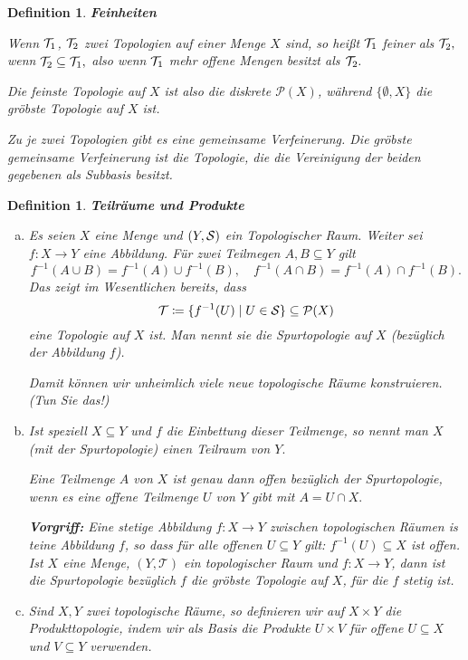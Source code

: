 \documentclass[12pt]{scrbook}   %
\newtheorem{definiX}[alles]{Definition}
\newenvironment{defini}[1]{\begin{definiX}{\bf #1}\par\rm}{\end{definiX}}
\newcommand{\da}{\coloneqq}
\begin{document}
\begin{defini} {\bf Feinheiten}
Wenn ${\cal T}_1$, ${\cal T}_2$ zwei Topologien auf einer Menge $X$ sind, so
heißt ${\cal T}_1$ {\it feiner} als ${\cal T}_2,$ wenn ${\cal T}_2\subseteq
{\cal T}_1,$ also wenn ${\cal T}_1$ mehr offene Mengen besitzt als ${\cal T}_2.$

Die feinste Topologie auf $X$ ist also die diskrete $\mathcal P(X)$, während 
$\{\emptyset, X\}$ die gröbste Topologie auf $X$ ist.

Zu je zwei Topologien gibt es eine gemeinsame Verfeinerung. Die gröbste 
gemeinsame Verfeinerung ist die Topologie, die die Vereinigung der beiden 
gegebenen als Subbasis besitzt.
\end{defini}

\begin{defini} {\bf Teilräume und Produkte}\label{Spurtopologie}
\begin{enumerate}[a)]
\item Es seien $X$ eine Menge und $(Y,{\cal S})$ ein Topologischer Raum. 
Weiter sei $f:X\longrightarrow Y$ eine Abbildung. Für zwei Teilmegen
$A,B\subseteq Y$ gilt
$$f^{-1}(A\cup B) = f^{-1}(A)\cup f^{-1}(B), \quad
f^{-1}(A\cap B) = f^{-1}(A)\cap f^{-1}(B).$$
Das zeigt im Wesentlichen bereits, dass 
$${\cal T}\da \{ f^{-1}(U) \mid U\in {\cal S}\} \subseteq \mathcal P(X)$$
eine Topologie auf $X$ ist. Man nennt sie die 
{\it Spurtopologie} auf $X$ (bezüglich der Abbildung $f$).

Damit können wir unheimlich viele neue topologische Räume konstruieren.
(Tun Sie das!) 
\item Ist speziell $X\subseteq Y$ und $f$ die Einbettung dieser Teilmenge,
so nennt man $X$ (mit der Spurtopologie) einen {\it Teilraum} von $Y.$

Eine Teilmenge $A$ von $X$ ist genau dann offen bezüglich der Spurtopologie, 
wenn es eine offene Teilmenge $U$ von $Y$ gibt mit $A= U\cap X.$

{\bf Vorgriff:} Eine stetige Abbildung $f: X\to Y$ zwischen topologischen Räumen is teine Abbildung $f$, so dass für alle offenen $U\subseteq Y$ gilt: $f^{-1}(U) \subseteq X$ ist offen. Ist $X$ eine Menge, $(Y,\mathcal T)$ ein topologischer Raum und $f: X\to Y$, dann ist die Spurtopologie bezüglich $f$ die gröbste Topologie auf $X$, für die $f$ stetig ist.

\item Sind $X,Y$ zwei topologische Räume, so definieren wir auf 
$X\times Y$ die {\it Produkttopologie}, indem wir 
als Basis die Produkte $U\times V$ für offene $U\subseteq X$ und
$V\subseteq Y$ verwenden. 
\end{enumerate}
\end{defini}
\end{document}
